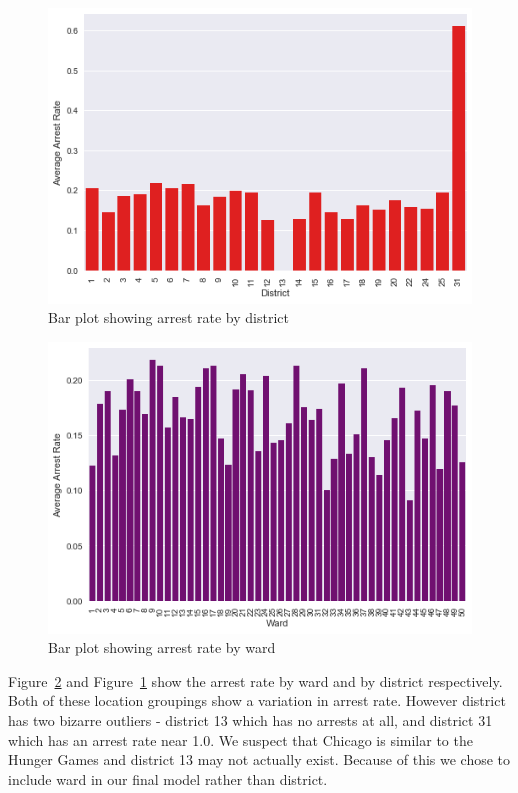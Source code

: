 \documentclass[10pt]{SelfArx} %
\begin{document}
    \begin{figure}[h]
      \includegraphics[width=\linewidth]{FinalVisualizations/district.png}
      \caption{Bar plot showing arrest rate by district}
      \label{fig:district}
    \end{figure}

    \begin{figure}[h]
      \includegraphics[width=\linewidth]{FinalVisualizations/ward.png}
      \caption{Bar plot showing arrest rate by ward}
      \label{fig:ward}
    \end{figure}

    Figure~\ref{fig:ward} and Figure~\ref{fig:district} show the arrest rate by
    ward and by district respectively. Both of these location groupings show
    a variation in arrest rate. However district has two bizarre outliers -
    district 13 which has no arrests at all, and district 31 which has an arrest
    rate near 1.0. We suspect that Chicago is similar to the Hunger Games and district
    13 may not actually exist. Because of this we chose to include ward in our
    final model rather than district.
\end{document}

